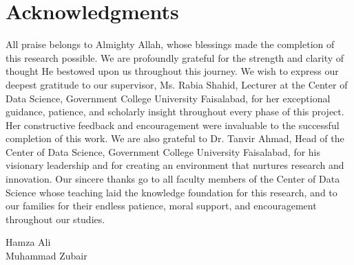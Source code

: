 
\chapter*{Acknowledgments}
All praise belongs to Almighty Allah, whose blessings made the completion of this research possible. We are profoundly grateful for the strength and clarity of thought He bestowed upon us throughout this journey. We wish to express our deepest gratitude to our supervisor, Ms. Rabia Shahid, Lecturer at the Center of Data Science, Government College University Faisalabad, for her exceptional guidance, patience, and scholarly insight throughout every phase of this project. Her constructive feedback and encouragement were invaluable to the successful completion of this work. We are also grateful to Dr. Tanvir Ahmad, Head of the Center of Data Science, Government College University Faisalabad, for his visionary leadership and for creating an environment that nurtures research and innovation. Our sincere thanks go to all faculty members of the Center of Data Science whose teaching laid the knowledge foundation for this research, and to our families for their endless patience, moral support, and encouragement throughout our studies.

\begin{flushright}
Hamza Ali\\
Muhammad Zubair
\end{flushright}
